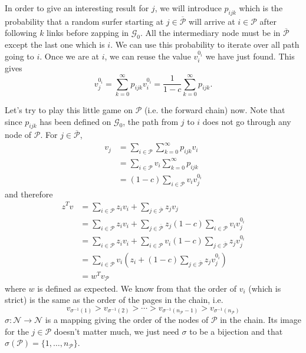 \documentclass{article}
\newcommand{\1}{\mathbf{1}}
\theoremstyle{definition}
\begin{document}
In order to give an interesting result for $j$, we will introduce \(p_{ijk}\) which is the probability that a random surfer starting at \(j \in \overline{\mathcal{P}}\)
will arrive at \(i \in \mathcal{P}\) after following \(k\) links before zapping in \(\mathcal{G}_0\).
All the intermediary node must be in \(\overline{\mathcal{P}}\) except the last one which is \(i\).
We can use this probability to iterate over all path going to \(i\).
Once we are at $i$, we can reuse the value \(v_i^{0_i}\) we have just found.
This gives
\[ v_j^{0_i} = \sum_{k=0}^\infty p_{ijk} v_i^{0_i} = \frac{1}{1-c} \sum_{k=0}^\infty p_{ijk}. \]

Let's try to play this little game on \(\mathcal{P}\) (i.e. the forward chain) now.
Note that since $p_{ijk}$ has been defined on $\mathcal{G}_0$, the path from $j$ to $i$ does not go through any node of $\mathcal{P}$.
For \(j \in \overline{\mathcal{P}}\),
\begin{align*}
  v_j & = \sum_{i \in \mathcal{P}} \sum_{k = 0}^\infty p_{ijk} v_i\\
      & = \sum_{i \in \mathcal{P}} v_i \sum_{k = 0}^\infty p_{ijk}\\
      & = (1-c) \sum_{i \in \mathcal{P}} v_i v_j^{0_i}
\end{align*}
and therefore
\begin{align*}
  z^T v
  & = \sum_{i \in \mathcal{P}} z_i v_i + \sum_{j \in \overline{\mathcal{P}}} z_j v_j\\
  & = \sum_{i \in \mathcal{P}} z_i v_i + \sum_{j \in \overline{\mathcal{P}}} z_j (1-c) \sum_{i \in \mathcal{P}} v_i v_j^{0_i}\\
  & = \sum_{i \in \mathcal{P}} z_i v_i + \sum_{i \in \mathcal{P}} v_i (1-c) \sum_{j \in \overline{\mathcal{P}}} z_j v_j^{0_i}\\
  & = \sum_{i \in \mathcal{P}} v_i \left(z_i + (1-c) \sum_{j \in \overline{\mathcal{P}}} z_jv_j^{0_i}\right)\\
  & = w^T v_\mathcal{P}
\end{align*}
where \(w\) is defined as expected.
We know from \cite{de2008maximizing} that the order of \(v_i\) (which is strict) is the same as
the order of the pages in the chain, i.e.
\[ v_{\sigma^{-1}(1)} > v_{\sigma^{-1}(2)} > \cdots > v_{\sigma^{-1}(n_\mathcal{P}-1)} > v_{\sigma^{-1}(n_\mathcal{P})} \]
\(\sigma : \mathcal{N} \to \mathcal{N}\) is a mapping giving the order of the nodes of $\mathcal{P}$ in the chain.
Its image for the $j \in \mathcal{P}$ doesn't matter much,
we just need $\sigma$ to be a bijection and that \(\sigma(\mathcal{P}) = \{1, \ldots, n_\mathcal{P}\}\).
\end{document}
